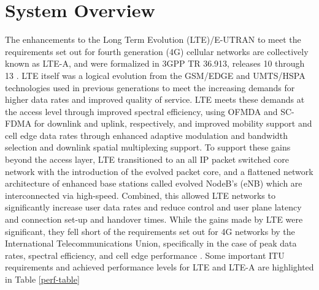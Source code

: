 \section{System Overview}
\label{sys-overview}
The enhancements to the Long Term Evolution (LTE)/E-UTRAN to meet the requirements set out for fourth generation (4G) cellular networks are collectively known as LTE-A, and were formalized in 3GPP TR 36.913, releases 10 through 13 \cite{tr36913}.  LTE itself was a logical evolution from the GSM/EDGE and UMTS/HSPA technologies used in previous generations to meet the increasing demands for higher data rates and improved quality of service. LTE meets these demands at the access level through improved spectral efficiency, using OFMDA and SC-FDMA for downlink and uplink, respectively, and improved mobility support and cell edge data rates through enhanced adaptive modulation and bandwidth selection and downlink spatial multiplexing support. To support these gains beyond the access layer, LTE transitioned to an all IP packet switched core network with the introduction of the evolved packet core, and a flattened network architecture of enhanced base stations called evolved NodeB's (eNB) which are interconnected via high-speed.  Combined, this allowed LTE networks to significantly increase user data rates and reduce control and user plane latency and connection set-up and handover times.  While the gains made by LTE were significant, they fell short of the requirements set out for 4G networks by the International Telecommunications Union, specifically in the case of peak data rates, spectral efficiency, and cell edge performance \cite{itu-advanced}. Some important ITU requirements and achieved performance levels for LTE and LTE-A are highlighted in Table \ref{perf-table}

